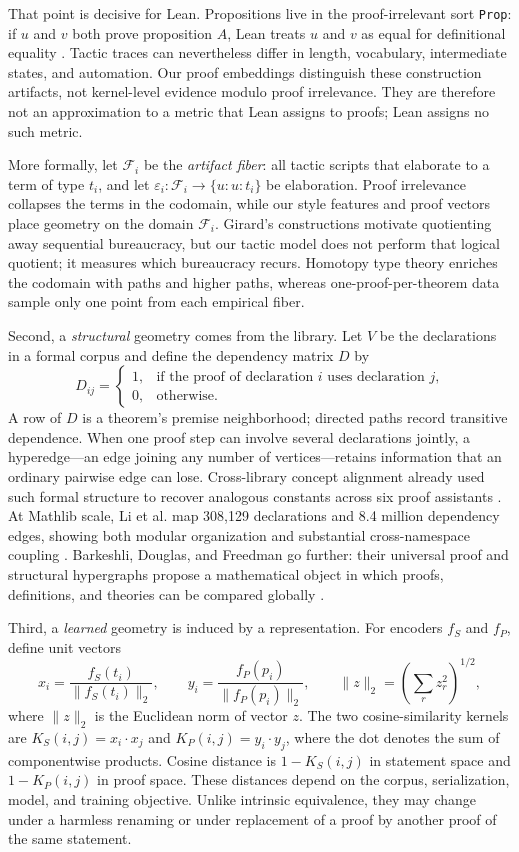 \documentclass[11pt]{article}
\begin{document}
That point is decisive for Lean.  Propositions live in the proof-irrelevant sort
\texttt{Prop}: if $u$ and $v$ both prove proposition $A$, Lean treats $u$ and $v$ as equal for
definitional equality \cite{lean4}.  Tactic traces can nevertheless differ in length, vocabulary,
intermediate states, and automation.  Our proof embeddings distinguish these construction
artifacts, not kernel-level evidence modulo proof irrelevance.  They are therefore not an
approximation to a metric that Lean assigns to proofs; Lean assigns no such metric.

More formally, let $\mathcal{F}_i$ be the \emph{artifact fiber}: all tactic scripts that elaborate
to a term of type $t_i$, and let $\varepsilon_i:\mathcal{F}_i\to\{u:u:t_i\}$ be elaboration.
Proof irrelevance collapses the terms in the codomain, while our style features and proof vectors
place geometry on the domain $\mathcal{F}_i$.  Girard's constructions motivate quotienting away
sequential bureaucracy, but our tactic model does not perform that logical quotient; it measures
which bureaucracy recurs.  Homotopy type theory enriches the codomain with paths and higher paths,
whereas one-proof-per-theorem data sample only one point from each empirical fiber.

Second, a \emph{structural} geometry comes from the library.  Let $V$ be the declarations in a
formal corpus and define the dependency matrix $D$ by
\[
 D_{ij}=\begin{cases}
 1,&\text{if the proof of declaration $i$ uses declaration $j$,}\\
 0,&\text{otherwise.}
 \end{cases}
\]
A row of $D$ is a theorem's premise neighborhood; directed paths record transitive dependence.
When one proof step can involve several declarations jointly, a hyperedge---an edge joining any
number of vertices---retains information that an ordinary pairwise edge can lose.  Cross-library
concept alignment already used such formal structure to recover analogous constants across six
proof assistants \cite{alignment}.  At Mathlib scale, Li et al. map 308,129 declarations and
8.4 million dependency edges, showing both modular organization and substantial cross-namespace
coupling \cite{network}.  Barkeshli, Douglas, and Freedman go further: their universal proof and
structural hypergraphs propose a mathematical object in which proofs, definitions, and theories
can be compared globally \cite{structure}.

Third, a \emph{learned} geometry is induced by a representation.  For encoders $f_S$ and $f_P$,
define unit vectors
\[
 x_i=\frac{f_S(t_i)}{\lVert f_S(t_i)\rVert_2},\qquad
 y_i=\frac{f_P(p_i)}{\lVert f_P(p_i)\rVert_2},\qquad
 \lVert z\rVert_2=\left(\sum_r z_r^2\right)^{1/2},
\]
where $\lVert z\rVert_2$ is the Euclidean norm of vector $z$.  The two cosine-similarity kernels
are $K_S(i,j)=x_i\mathbin{\cdot}x_j$ and $K_P(i,j)=y_i\mathbin{\cdot}y_j$, where the dot
denotes the sum of componentwise products.  Cosine distance is $1-K_S(i,j)$ in statement space
and $1-K_P(i,j)$ in proof space.  These distances depend on the corpus, serialization, model, and
training objective.  Unlike intrinsic equivalence, they may change under a harmless renaming or
under replacement of a proof by another proof of the same statement.
\end{document}
